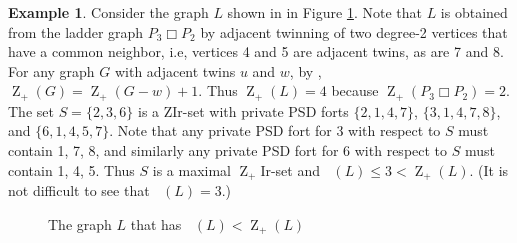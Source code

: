 \documentclass{article}
\numberwithin{figure}{section}
\numberwithin{table}{section}
\numberwithin{equation}{section}
\theoremstyle{definition}
\theoremstyle{definition}
\theoremstyle{definition}
\newtheorem{ex}[thm]{Example}
\newcommand{\Zp}{\operatorname{Z}_+}
\DeclareMathOperator{\zpir}{z_+ir}
\begin{document}
\begin{ex}\label{ex:Zp-z+ir}
   Consider the graph $L$ shown in in Figure \ref{f:Zp-z+ir}.   Note that $L$ is obtained from the ladder graph $P_3\Box P_2$ by adjacent twinning of two degree-2 vertices that have a common neighbor, i.e, vertices 4 and 5 are adjacent twins, as are 7 and 8.  For any graph $G$ with adjacent twins  $u$ and $w$, by \cite[Proposition 9.47]{HLS22book}, $\Zp(G)=\Zp(G-w)+1$.  Thus $\Zp(L)=4$ because $\Zp(P_3\Box P_2)=2$.  The set $S=\{2,3,6\}$ is a ZIr-set with private PSD forts  $\{2,1,4,7\}$, $\{3,1,4,7,8\}$, and $\{6,1,4,5,7\}$.  Note that any private PSD fort for 3 with respect to $S$ must contain 1, 7, 8, and similarly any private PSD fort for 6 with respect to $S$ must contain 1, 4, 5. Thus $S$ is a maximal $\Zp$Ir-set and $\zpir(L)\le 3<\Zp(L)$.  (It is not difficult to see that $\zpir(L)= 3$.)


\begin{figure}[!h]
\centering
{}
    \caption{\label{f:Zp-z+ir} The graph $L$ that has $\zpir(L)<\Zp(L)$ }  
\end{figure}

\end{ex}
\end{document}
